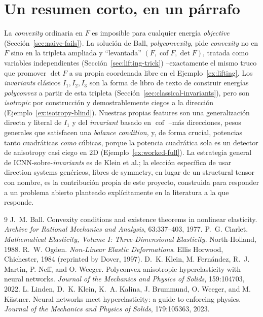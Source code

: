 \documentclass[11pt,a4paper]{article}
\newcommand{\Cof}{\operatorname{cof}}
\begin{document}
\section{Un resumen corto, en un p\'arrafo}
\label{sec:recap}

La \emph{convexity} ordinaria en $F$ es imposible para cualquier
energ\'ia \emph{objective} (Secci\'on~\ref{sec:naive-fails}). La
soluci\'on de Ball, \emph{polyconvexity}, pide \emph{convexity} no en
$F$ sino en la tripleta ampliada y ``levantada'' $(F,\Cof F,\det F)$,
tratada como variables independientes
(Secci\'on~\ref{sec:lifting-trick}) --exactamente el mismo truco que
promover $\det F$ a su propia coordenada libre en el
Ejemplo~\ref{ex:lifting}. Los \emph{invariants} cl\'asicos $I_1,I_2,I_3$
son la forma de libro de texto de construir energ\'ias
\emph{polyconvex} a partir de esta tripleta
(Secci\'on~\ref{sec:classical-invariants}), pero son \emph{isotropic}
por construcci\'on y demostrablemente ciegos a la direcci\'on
(Ejemplo~\ref{ex:isotropy-blind}). Nuestras propias features son una
generalizaci\'on directa y literal de $I_1$ y del \emph{invariant}
basado en $\Cof$ --m\'as direcciones, pesos generales que satisfacen una
\emph{balance condition}, y, de forma crucial, potencias tanto
cuadr\'aticas \emph{como} c\'ubicas, porque la potencia cuadr\'atica
sola es un detector de anisotropy casi ciego en 2D
(Ejemplo~\ref{ex:worked-full}). La estrategia general de
ICNN-sobre-\emph{invariants} es de Klein et al.; la elecci\'on
espec\'ifica de usar direction systems gen\'ericos, libres de symmetry,
en lugar de un structural tensor con nombre, es la contribuci\'on
propia de este proyecto, construida para responder a un problema
abierto planteado expl\'icitamente en la literatura a la que responde.

\begin{thebibliography}{9}
J.~M. Ball. Convexity conditions and existence theorems in nonlinear
elasticity. \emph{Archive for Rational Mechanics and Analysis}, 63:337--403,
1977.
P.~G. Ciarlet. \emph{Mathematical Elasticity, Volume I: Three-Dimensional
Elasticity}. North-Holland, 1988.
R.~W. Ogden. \emph{Non-Linear Elastic Deformations}. Ellis Horwood,
Chichester, 1984 (reprinted by Dover, 1997).
D.~K. Klein, M. Fern\'andez, R.~J. Martin, P. Neff, and O. Weeger.
Polyconvex anisotropic hyperelasticity with neural networks.
\emph{Journal of the Mechanics and Physics of Solids}, 159:104703, 2022.
L. Linden, D.~K. Klein, K.~A. Kalina, J. Brummund, O. Weeger, and
M. K\"astner. Neural networks meet hyperelasticity: a guide to enforcing
physics. \emph{Journal of the Mechanics and Physics of Solids},
179:105363, 2023.
\end{thebibliography}
\end{document}
